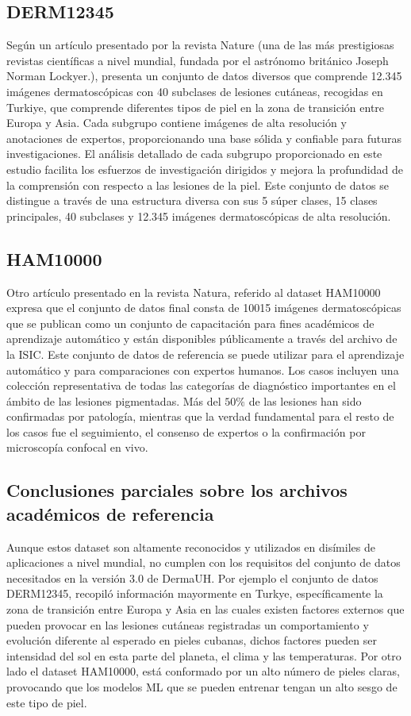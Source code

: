 \subsection{DERM12345}
Seg\'un un art\'iculo presentado por la revista Nature (una de las más prestigiosas revistas 
científicas a nivel mundial, fundada por el astrónomo británico Joseph Norman Lockyer.),
presenta un conjunto de datos diversos que comprende 12.345 imágenes dermatoscópicas 
con 40 subclases de lesiones cutáneas, recogidas en Turkiye, que comprende diferentes 
tipos de piel en la zona de transición entre Europa y Asia. Cada subgrupo contiene 
imágenes de alta resolución y anotaciones de expertos, proporcionando una base sólida y 
confiable para futuras investigaciones. El análisis detallado de cada subgrupo 
proporcionado en este estudio facilita los esfuerzos de investigación dirigidos y 
mejora la profundidad de la comprensión con respecto a las lesiones de la piel. 
Este conjunto de datos se distingue a través de una estructura diversa con sus 5 súper 
clases, 15 clases principales, 40 subclases y 12.345 imágenes dermatoscópicas de alta 
resolución\cite{Derm12345}.

\subsection{HAM10000}
Otro art\'iculo presentado en la revista Natura, referido al dataset HAM10000 expresa que
el conjunto de datos final consta de 10015 imágenes dermatoscópicas que se publican como 
un conjunto de capacitación para fines académicos de aprendizaje automático y están 
disponibles públicamente a través del archivo de la ISIC. Este conjunto de datos de 
referencia se puede utilizar para el aprendizaje automático y para comparaciones con 
expertos humanos. Los casos incluyen una colección representativa de todas las categorías 
de diagnóstico importantes en el ámbito de las lesiones pigmentadas. Más del $50\%$ 
de las lesiones han sido confirmadas por patología, mientras que la verdad fundamental 
para el resto de los casos fue el seguimiento, el consenso de expertos o la confirmación 
por microscopía confocal en vivo\cite{HAM1000}.

\subsection{Conclusiones parciales sobre los archivos acad\'emicos de referencia}
Aunque estos dataset son altamente reconocidos y utilizados en dis\'imiles de aplicaciones
a nivel mundial, no cumplen con los requisitos del conjunto de datos necesitados en la versi\'on 3.0
de DermaUH. Por ejemplo el conjunto de datos DERM12345, recopil\'o informaci\'on mayormente
en Turkye, espec\'ificamente la zona de transici\'on entre Europa y Asia en las cuales 
existen factores externos que pueden provocar en las lesiones cut\'aneas registradas un 
comportamiento y evoluci\'on diferente al esperado en pieles cubanas, 
dichos factores pueden ser intensidad del sol en esta parte del planeta, 
el clima y las temperaturas\cite{pielClima}. Por otro lado el dataset HAM10000, est\'a 
conformado por un alto n\'umero de pieles claras, provocando que los modelos ML 
que se pueden entrenar tengan un alto sesgo de este tipo de piel.

